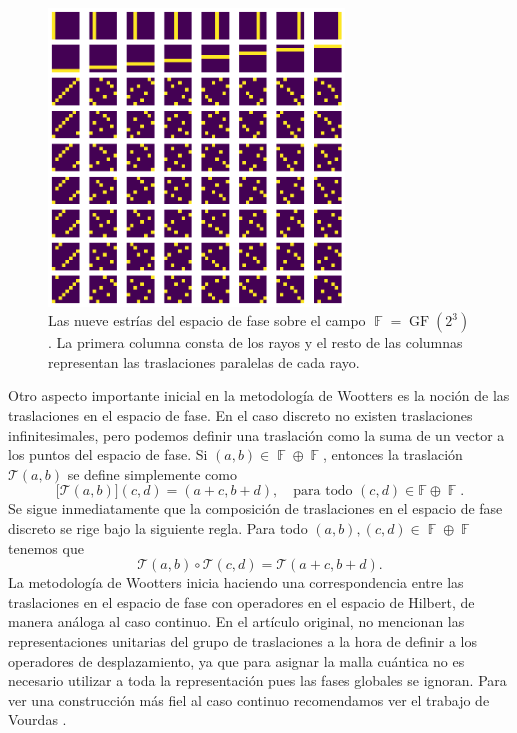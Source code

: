 \documentclass[a4paper,11pt]{report}
\DeclareMathOperator{\F}{\mathbb{F}}
\DeclareMathOperator{\GF}{GF}
\begin{document}
  \begin{figure}[ht]
    \centering
    \includegraphics[width=0.7\textwidth]{imgs/GF23.png}
    \caption{Las nueve estrías del espacio de fase sobre el
    campo $\F = \GF\left(2^3\right)$. La primera columna
    consta de los rayos y el resto de las columnas
    representan las traslaciones paralelas de cada rayo.}
    \label{fig:GF-2-3}
  \end{figure}
  Otro aspecto importante inicial en la metodología de
  Wootters es la noción de las traslaciones en el espacio de
  fase. En el caso discreto no existen traslaciones
  infinitesimales, pero podemos definir una traslación como
  la suma de un vector a los puntos del espacio de fase. Si
  $(a,b) \in \F \oplus \F$, entonces la traslación $\mathcal
  T(a,b)$ se define simplemente como
  \begin{equation}
    \mathcal [\mathcal T(a,b)](c,d) = (a+c, b+d),
    \quad
    \text{para todo } (c,d) \in \mathbb F \oplus \F.
  \end{equation} 
  Se sigue inmediatamente que la composición de traslaciones
  en el espacio de fase discreto se rige bajo la siguiente
  regla. Para todo $(a,b), (c,d) \in \F \oplus \F$ tenemos
  que
  \begin{equation}
    \label{eqn:translation_composition}
    \mathcal T(a,b) \circ \mathcal T(c,d)
    = \mathcal T(a+c,b+d).
  \end{equation}
  La metodología de Wootters inicia haciendo una
  correspondencia entre las traslaciones en el espacio de
  fase con operadores en el espacio de Hilbert, de manera
  análoga al caso continuo. En el artículo original, no
  mencionan las representaciones unitarias del grupo de
  traslaciones a la hora de definir a los operadores de
  desplazamiento, ya que para asignar la malla cuántica no
  es necesario utilizar a toda la representación pues las
  fases globales se ignoran. Para ver una construcción más
  fiel al caso continuo recomendamos ver el trabajo de
  Vourdas \cite{vourdas2005}.
\end{document}
